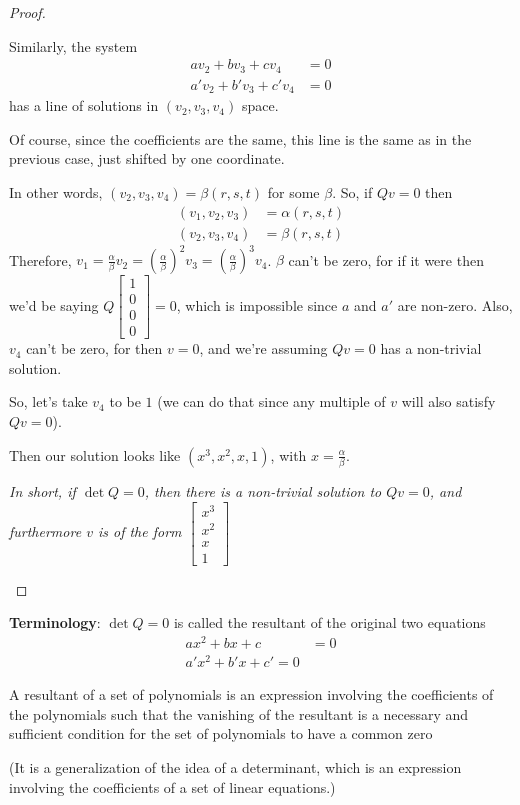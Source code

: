 \begin{proof}
\begin{enumerate}
Similarly, the system
\begin{align*}
  av_2 + bv_3 + cv_4 &= 0 \\
  a'v_2 + b'v_3 + c'v_4 &= 0
\end{align*}
has a line of solutions in $(v_2, v_3, v_4)$ space.

Of course, since the coefficients are the same, this line is the same
as in the previous case, just shifted by one coordinate.

In other words, $(v_2, v_3, v_4) = \beta(r, s, t)$ for some $\beta$.
So, if $Qv = 0$ then
\begin{align*}
  (v_1, v_2, v_3) &= \alpha(r, s, t) \\
  (v_2, v_3, v_4) &= \beta(r, s, t)
\end{align*}
Therefore, $v_1 = \frac{\alpha}{\beta}v_2 = \left(
  \frac{\alpha}{\beta} \right)^2v_3 = \left( \frac{\alpha}{\beta}
\right)^3v_4$. $\beta$ can't be zero, for if it were then we'd be
saying $Q
\begin{bmatrix}
  1 \\ 0 \\ 0 \\ 0
\end{bmatrix} = 0
$, which is impossible since $a$ and $a'$ are non-zero. Also, $v_4$
can't be zero, for then $v = 0$, and we're assuming $Qv = 0$ has a
non-trivial solution.

So, let's take $v_4$ to be $1$ (we can do that since any multiple of
$v$ will also satisfy $Qv = 0$).

Then our solution looks like $(x^3, x^2, x, 1)$, with $x =
\frac{\alpha}{\beta}$.


\textit{In short, if $\det Q = 0$, then there is a non-trivial
  solution to $Qv = 0$, and furthermore $v$ is of the form $
  \begin{bmatrix}
    x^3 \\ x^2 \\ x \\ 1
  \end{bmatrix}
$}
  \end{enumerate}
\end{proof}

\textbf{Terminology}: $\det Q = 0$ is called the resultant of the
original two equations
\begin{align*}
  ax^2 + bx + c &= 0 \\
  a'x^2 + b'x + c' = 0
\end{align*}

\begin{definition}[Resultant]
  A resultant of a set of polynomials is an expression involving the
  coefficients of the polynomials such that the vanishing of the
  resultant is a necessary and sufficient condition for the set of
  polynomials to have a common zero

  (It is a generalization of the idea of a determinant, which is an
  expression involving the coefficients of a set of linear equations.)
\end{definition}

